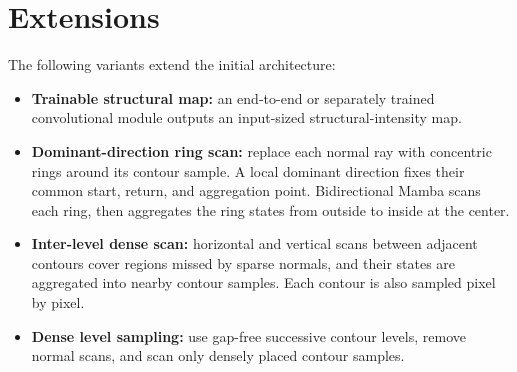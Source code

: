 \section{Extensions}
\label{sec:future}

The following variants extend the initial architecture:
\begin{itemize}[leftmargin=*,itemsep=0pt,topsep=1pt]
    \item \textbf{Trainable structural map:} an end-to-end or separately trained convolutional module outputs an input-sized structural-intensity map.
    \item \textbf{Dominant-direction ring scan:} replace each normal ray with concentric rings around its contour sample. A local dominant direction fixes their common start, return, and aggregation point. Bidirectional Mamba scans each ring, then aggregates the ring states from outside to inside at the center.
    \item \textbf{Inter-level dense scan:} horizontal and vertical scans between adjacent contours cover regions missed by sparse normals, and their states are aggregated into nearby contour samples. Each contour is also sampled pixel by pixel.
    \item \textbf{Dense level sampling:} use gap-free successive contour levels, remove normal scans, and scan only densely placed contour samples.
\end{itemize}
